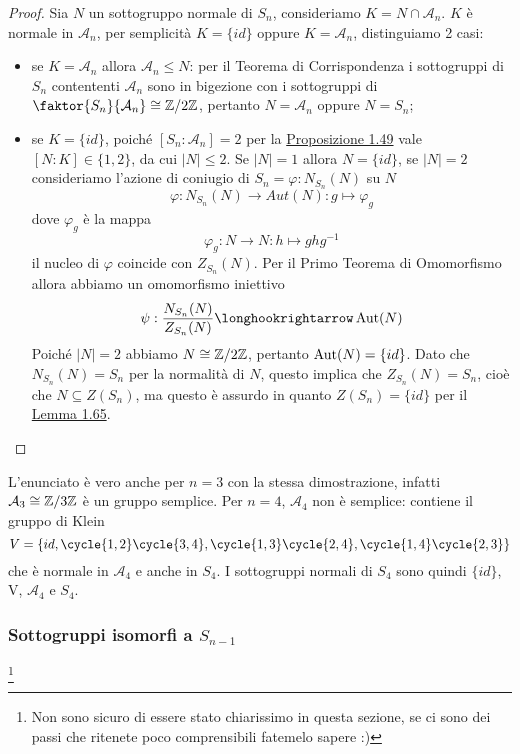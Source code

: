\documentclass[11pt]{scrartcl}
\begin{document}
\begin{proof}
    Sia $N$ un sottogruppo normale di $S_n$, consideriamo $K= N \cap \mathcal{A}_n$.
    $K$ è normale in $\mathcal{A}_n$, per semplicità $K = \{id\}$ oppure $K = \mathcal{A}_n$,
    distinguiamo 2 casi:
    \begin{itemize}
        \item se $K = \mathcal{A}_n$ allora $\mathcal{A}_n \leqslant N$: per il
        Teorema di Corrispondenza i sottogruppi di $S_n$ contententi $\mathcal{A}_n$
        sono in bigezione con i sottogruppi di $\faktor{S_n}{\mathcal{A}_n}\cong \Z2$,
        pertanto $N = \mathcal{A}_n$ oppure $N = S_n$;
        \item se $K = \{id\}$, poiché $[S_n:\mathcal{A}_n] = 2$ per la 
        \hyperref[prop1.49]{Proposizione 1.49} vale $[N:K] \in \{1, 2\}$, 
        da cui $|N| \leq 2$. Se $|N| = 1$ allora $N = \{id\}$, se $|N| = 2$
        consideriamo l'azione di coniugio di $S_n = \varphi: N_{S_n}(N)$ su $N$
        \[
            \varphi: N_{S_n}(N)\longrightarrow Aut(N): g \longmapsto \varphi_g
        \]
        dove $\varphi_g$ è la mappa
        \[
            \varphi_g : N \longrightarrow N :h \longmapsto ghg^{-1}
        \]
        il nucleo di $\varphi$ coincide con $Z_{S_n}(N)$. Per il Primo Teorema
        di Omomorfismo allora abbiamo un omomorfismo iniettivo
        \[
            \psi :\frac{N_{S_n}(N)}{Z_{S_n}(N)}\longhookrightarrow \Aut(N)
        \]
        Poiché $|N| = 2$ abbiamo $N \cong \mathbb{Z}/{2}\mathbb{Z}$, pertanto $\operatorname{Aut}(N) = \{id\}$. 
        Dato che $N_{S_n}(N) = S_n$ per la normalità di $N$, questo implica che
        $Z_{S_n}(N) = S_n$, cioè che $N \subseteq Z(S_n)$, ma questo è assurdo
        in quanto $Z(S_n) = \{id\}$ per il \hyperref[lemma1.65]{Lemma 1.65}.
    \end{itemize}
\end{proof}

\begin{remark}
    L'enunciato è vero anche per $n = 3$ con la stessa dimostrazione, infatti
    $\mathcal{A}_3 \cong \mathbb{Z}/{3}\mathbb{Z}$ è un gruppo semplice.
    Per $n = 4$, $\mathcal{A}_4$ non è semplice: contiene il gruppo di Klein
    \[
        V = \{ id, \cycle{1,2}\cycle{3,4}, \cycle{1,3}\cycle{2,4}, \cycle{1,4}\cycle{2,3} \} 
    \]
    che è normale in $\mathcal{A}_4$ e anche in $S_4$.
    I sottogruppi normali di $S_4$ sono quindi $\{id\}$, V, $\mathcal{A}_4$ e $S_4$.
\end{remark}


\subsubsection{Sottogruppi isomorfi a $S_{n - 1}$}\footnote{
    Non sono sicuro di essere stato chiarissimo in questa sezione, se ci 
    sono dei passi che ritenete poco comprensibili fatemelo sapere :)
}
\end{document}
